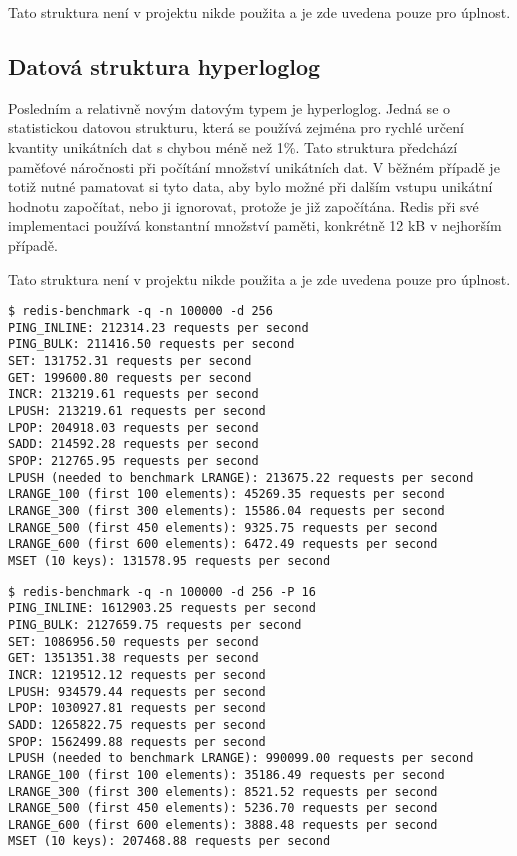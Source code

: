 Tato struktura není v projektu nikde použita a je zde uvedena pouze pro úplnost.

\subsection{Datová struktura hyperloglog}
Posledním a relativně novým datovým typem je hyperloglog. Jedná se o statistickou datovou strukturu, která se používá zejména pro rychlé určení kvantity unikátních dat s chybou méně než 1\%. Tato struktura předchází paměťové náročnosti při počítání množství unikátních dat. V běžném případě je totiž nutné pamatovat si tyto data, aby bylo možné při dalším vstupu unikátní hodnotu započítat, nebo ji ignorovat, protože je již započítána. Redis při své implementaci používá konstantní množství paměti, konkrétně 12 kB v nejhorším případě.

Tato struktura není v projektu nikde použita a je zde uvedena pouze pro úplnost.

\cite{redis-benchmark}

\begin{verbatim}
$ redis-benchmark -q -n 100000 -d 256
PING_INLINE: 212314.23 requests per second
PING_BULK: 211416.50 requests per second
SET: 131752.31 requests per second
GET: 199600.80 requests per second
INCR: 213219.61 requests per second
LPUSH: 213219.61 requests per second
LPOP: 204918.03 requests per second
SADD: 214592.28 requests per second
SPOP: 212765.95 requests per second
LPUSH (needed to benchmark LRANGE): 213675.22 requests per second
LRANGE_100 (first 100 elements): 45269.35 requests per second
LRANGE_300 (first 300 elements): 15586.04 requests per second
LRANGE_500 (first 450 elements): 9325.75 requests per second
LRANGE_600 (first 600 elements): 6472.49 requests per second
MSET (10 keys): 131578.95 requests per second
\end{verbatim}

\begin{verbatim}
$ redis-benchmark -q -n 100000 -d 256 -P 16
PING_INLINE: 1612903.25 requests per second
PING_BULK: 2127659.75 requests per second
SET: 1086956.50 requests per second
GET: 1351351.38 requests per second
INCR: 1219512.12 requests per second
LPUSH: 934579.44 requests per second
LPOP: 1030927.81 requests per second
SADD: 1265822.75 requests per second
SPOP: 1562499.88 requests per second
LPUSH (needed to benchmark LRANGE): 990099.00 requests per second
LRANGE_100 (first 100 elements): 35186.49 requests per second
LRANGE_300 (first 300 elements): 8521.52 requests per second
LRANGE_500 (first 450 elements): 5236.70 requests per second
LRANGE_600 (first 600 elements): 3888.48 requests per second
MSET (10 keys): 207468.88 requests per second
\end{verbatim}

